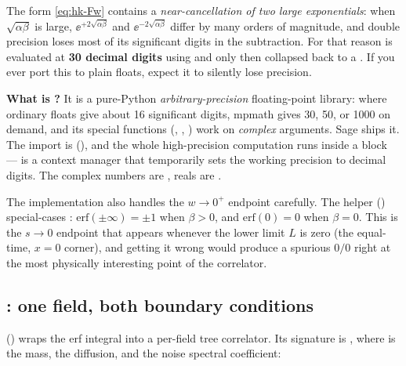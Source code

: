 \begin{gotcha}
The form \eqref{eq:hk-Fw} contains a \emph{near-cancellation of two large
exponentials}: when $\sqrt{\alpha\beta}$ is large, $\ee^{+2\sqrt{\alpha\beta}}$
and $\ee^{-2\sqrt{\alpha\beta}}$ differ by many orders of magnitude, and double
precision loses most of its significant digits in the subtraction. For that
reason  is evaluated at \textbf{30 decimal digits}
using  and only then collapsed back to a . If you
ever port this to plain floats, expect it to silently lose precision.
\end{gotcha}

\begin{note}
\textbf{What is ?} It is a pure-Python \emph{arbitrary-precision}
floating-point library: where ordinary floats give about 16 significant digits,
mpmath gives 30, 50, or 1000 on demand, and its special functions (,
, ) work on \emph{complex} arguments. Sage ships it. The
import is  (), and the whole
high-precision computation runs inside a  block ---
 is a context manager that temporarily sets the working precision
to  decimal digits. The complex numbers are , reals
are .
\end{note}

The implementation also handles the $w\to 0^{+}$ endpoint carefully. The helper
 () special-cases :
$\mathrm{erf}(\pm\infty)=\pm 1$ when $\beta>0$, and $\mathrm{erf}(0)=0$ when
$\beta=0$. This is the $s\to 0$ endpoint that appears whenever the lower limit
$L$ is zero (the equal-time, $x=0$ corner), and getting it wrong would produce a
spurious $0/0$ right at the most physically interesting point of the correlator.

\subsection{: one field, both boundary conditions}

 () wraps the erf
integral into a per-field tree correlator. Its signature is
,
where  is the mass,  the diffusion, and  the noise
spectral coefficient:

